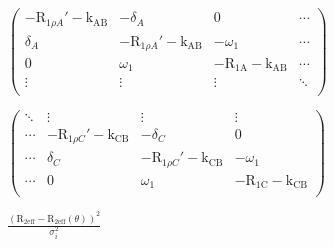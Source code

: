 \documentclass[a4paper,11pt,twoside,openright]{book}
\def\lthtmlcheckvsize{\ifdim\ht\sizebox<\vsize 
  \ifdim\wd\sizebox<\hsize\expandafter\hfill\fi \expandafter\vfill
  \else\expandafter\vss\fi}%
\begin{document}
{\newpage\clearpage
{}%
$\displaystyle \begin{pmatrix}
-\mathrm{R}_{1\rho A}'-\textrm{k}_{\textrm{AB}}& -\delta_A            & 0            & \cdots \\
\delta_A             & -\mathrm{R}_{1\rho A}'-\textrm{k}_{\textrm{AB}}& -\omega_1 & \cdots \\
0                    & \omega_1 & -\mathrm{R}_{\textrm{1A}}-\textrm{k}_{\textrm{AB}}& \cdots \\
\vdots               & \vdots               & \vdots       & \ddots \\
\end{pmatrix}$%
\lthtmlindisplaymathZ
\lthtmlcheckvsize\clearpage}

{\newpage\clearpage
{}%
$\displaystyle \begin{pmatrix}
\ddots & \vdots               & \vdots               & \vdots \\
\cdots & -\mathrm{R}_{1\rho C}'-\textrm{k}_{\textrm{CB}}& -\delta_C            & 0 \\
\cdots & \delta_C             & -\mathrm{R}_{1\rho C}'-\textrm{k}_{\textrm{CB}}& -\omega_1 \\
\cdots & 0                    & \omega_1 & -\mathrm{R}_{\textrm{1C}}-\textrm{k}_{\textrm{CB}}\\
\end{pmatrix}$%
\lthtmlindisplaymathZ
\lthtmlcheckvsize\clearpage}

{\newpage\clearpage
{}%
$\displaystyle {\frac{{(\mathrm{R}_{\textrm{2eff}}- \mathrm{R}_{\textrm{2eff}}(\theta))^2}}{{\sigma_i^2}}}$%
\lthtmlindisplaymathZ
\lthtmlcheckvsize\clearpage}
\end{document}
